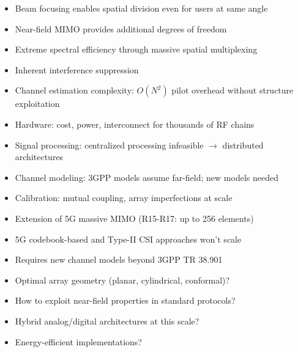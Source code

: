 

\begin{itemize}
\tightlist
\item
  Beam focusing enables spatial division even for users at same angle
\item
  Near-field MIMO provides additional degrees of freedom
\item
  Extreme spectral efficiency through massive spatial multiplexing
\item
  Inherent interference suppression
\end{itemize}


\begin{itemize}
\tightlist
\item
  Channel estimation complexity: $O(N^2)$ pilot overhead without structure exploitation
\item
  Hardware: cost, power, interconnect for thousands of RF chains
\item
  Signal processing: centralized processing infeasible \ensuremath{\to} distributed architectures
\item
  Channel modeling: 3GPP models assume far-field; new models needed
\item
  Calibration: mutual coupling, array imperfections at scale
\end{itemize}


\begin{itemize}
\tightlist
\item
  Extension of 5G massive MIMO (R15-R17: up to 256 elements)
\item
  5G codebook-based and Type-II CSI approaches won’t scale
\item
  Requires new channel models beyond 3GPP TR 38.901
\end{itemize}


\begin{itemize}
\tightlist
\item
  Optimal array geometry (planar, cylindrical, conformal)?
\item
  How to exploit near-field properties in standard protocols?
\item
  Hybrid analog/\allowbreak{}digital architectures at this scale?
\item
  Energy-efficient implementations?
\end{itemize}

